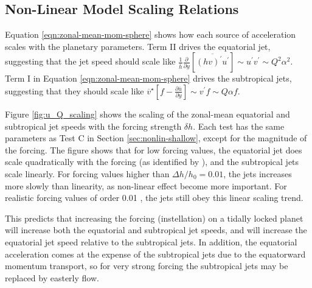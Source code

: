 \subsection{Non-Linear Model Scaling Relations}\label{sec:nonline-scaling-relations}

Equation \ref{eqn:zonal-mean-mom-sphere} shows how each source of acceleration scales with the planetary parameters. Term II drives the equatorial jet, suggesting that the jet speed should scale like $\frac{1}{\overline{h}} \frac{\partial}{\partial y}\left[\overline{(h v)^{\prime} u^{\prime}}\right] \sim u^{\prime} v^{\prime} \sim Q^{2}\alpha^{2}$. Term I in Equation \ref{eqn:zonal-mean-mom-sphere} drives the subtropical jets, suggesting that they should scale like $\overline{v}^{\star}\left[f-\frac{\partial \overline{u}}{\partial y}\right] \sim v^{\prime} f \sim Q\alpha f$.

Figure \ref{fig:u_Q_scaling} shows the scaling of the zonal-mean equatorial and subtropical jet speeds with the forcing strength $\delta h$. Each test has the same parameters as Test C in Section \ref{sec:nonlin-shallow}, except for the magnitude of the forcing. The figure shows that for low forcing values, the equatorial jet does scale quadratically with the forcing (as identified by \citet{showman2011superrotation}), and the subtropical jets scale linearly. For forcing values higher than $\Delta h / h_{0} = 0.01$, the jets increases more slowly than linearity, as non-linear effect become more important. For realistic forcing values of order 0.01 \citep{showman2011superrotation}, the jets still obey this linear scaling trend.


This predicts that increasing the forcing (instellation) on a tidally locked planet will increase both the equatorial and subtropical jet speeds, and will increase the equatorial jet speed relative to the subtropical jets. In addition, the equatorial acceleration comes at the expense of the subtropical jets due to the equatorward momentum transport, so for very strong forcing the subtropical jets may be replaced by easterly flow.


